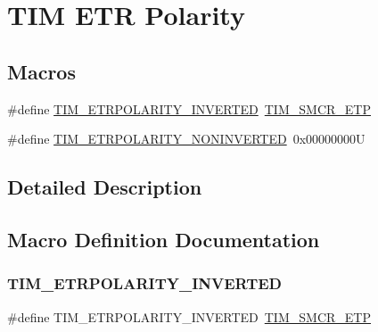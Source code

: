 \hypertarget{group___t_i_m___e_t_r___polarity}{}\section{T\+IM E\+TR Polarity}
\label{group___t_i_m___e_t_r___polarity}
\subsection*{Macros}
\begin{DoxyCompactItemize}
\item 
\#define \mbox{\hyperlink{group___t_i_m___e_t_r___polarity_ga42652ff688f0042659f8304ae08abfa6}{T\+I\+M\+\_\+\+E\+T\+R\+P\+O\+L\+A\+R\+I\+T\+Y\+\_\+\+I\+N\+V\+E\+R\+T\+ED}}~\mbox{\hyperlink{group___peripheral___registers___bits___definition_ga2a5f335c3d7a4f82d1e91dc1511e3322}{T\+I\+M\+\_\+\+S\+M\+C\+R\+\_\+\+E\+TP}}
\item 
\#define \mbox{\hyperlink{group___t_i_m___e_t_r___polarity_ga7fa7c43245b25564414b2e191d5d8b14}{T\+I\+M\+\_\+\+E\+T\+R\+P\+O\+L\+A\+R\+I\+T\+Y\+\_\+\+N\+O\+N\+I\+N\+V\+E\+R\+T\+ED}}~0x00000000U
\end{DoxyCompactItemize}


\subsection{Detailed Description}


\subsection{Macro Definition Documentation}
\mbox{\label{group___t_i_m___e_t_r___polarity_ga42652ff688f0042659f8304ae08abfa6}} 
\subsubsection{\texorpdfstring{TIM\_ETRPOLARITY\_INVERTED}{TIM\_ETRPOLARITY\_INVERTED}}
{\footnotesize\ttfamily \#define T\+I\+M\+\_\+\+E\+T\+R\+P\+O\+L\+A\+R\+I\+T\+Y\+\_\+\+I\+N\+V\+E\+R\+T\+ED~\mbox{\hyperlink{group___peripheral___registers___bits___definition_ga2a5f335c3d7a4f82d1e91dc1511e3322}{T\+I\+M\+\_\+\+S\+M\+C\+R\+\_\+\+E\+TP}}}

